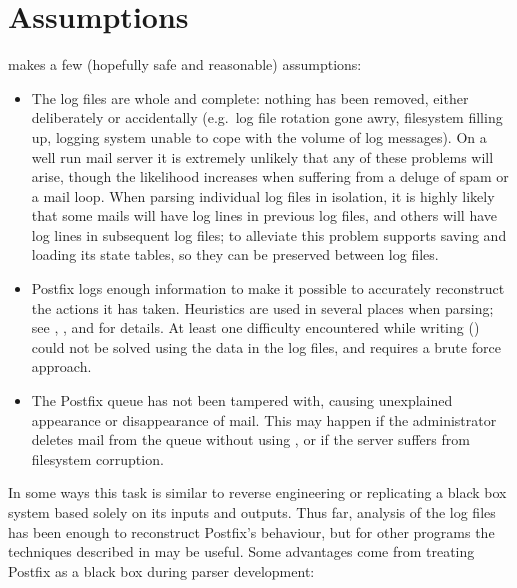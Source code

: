\section{Assumptions}

\parsername{} makes a few (hopefully safe and reasonable) assumptions:

\begin{itemize}

    \item The log files are whole and complete: nothing has been removed,
        either deliberately or accidentally (e.g.\ log file rotation gone
        awry, filesystem filling up, logging system unable to cope with the
        volume of log messages).  On a well run mail server it is extremely
        unlikely that any of these problems will arise, though the
        likelihood increases when suffering from a deluge of spam or a mail
        loop.  When parsing individual log files in isolation, it is highly
        likely that some mails will have log lines in previous log files,
        and others will have log lines in subsequent log files; to
        alleviate this problem \parsername{} supports saving and loading
        its state tables, so they can be preserved between log files.

    \item Postfix logs enough information to make it possible to accurately
        reconstruct the actions it has taken.  Heuristics are used in
        several places when parsing; see , , and
         for details.  At least
        one difficulty encountered while writing \parsername{}
        () could not be
        solved using the data in the log files, and requires a brute force
        approach.

    \item The Postfix queue has not been tampered with, causing unexplained
        appearance or disappearance of mail.  This may happen if the
        administrator deletes mail from the queue without using
        , or if the server suffers from filesystem
        corruption.

\end{itemize}

In some ways this task is similar to reverse engineering or replicating a
black box system based solely on its inputs and outputs.  Thus far,
analysis of the log files has been enough to reconstruct Postfix's
behaviour, but for other programs the techniques described in
\cite{black-box-error-reporting} may be useful.  Some advantages come from
treating Postfix as a black box during parser development:

